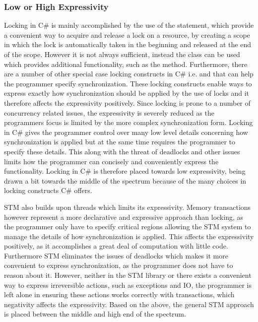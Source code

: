 \subsubsection{Low or High Expressivity}\label{subsec:expressivity}
Locking in C\# is mainly accomplished by the use of the  statement, which provide a convenient way to acquire and release a lock on a resource, by creating a scope in which the lock is automatically taken in the beginning and released at the end of the scope. However it is not always sufficient, instead the  class can be used which provides additional functionality, such as the  method. Furthermore, there are a number of other special case locking constructs in C\#\cite{microsoftSyncPrim} i.e.    and  that can help the programmer specify synchronization. These locking constructs enable ways to express exactly how synchronization should be applied by the use of locks and it therefore affects the expressivity positively. Since locking is prone to a number of concurrency related issues, the expressivity is severely reduced as the programmers focus is limited by the more complex synchronization form. Locking in C\# gives the programmer control over many low level details concerning how synchronization is applied but at the same time requires the programmer to specify these details. This along with the threat of deadlocks and other issues limits how the programmer can concisely and conveniently express the functionality. Locking in C\# is therefore placed towards low expressivity, being drawn a bit towards the middle of the spectrum because of the many choices in locking constructs C\# offers.

\ac{STM} also builds upon threads which limits its expressivity. Memory transactions however represent a more declarative and expressive approach than locking, as the programmer only have to specify critical regions allowing the \ac{STM} system to manage the details of how synchronization is applied. This affects the expressivity positively, as it accomplishes a great deal of computation with little code. Furthermore \ac{STM} eliminates the issues of deadlocks which makes it more convenient to express synchronization, as the programmer does not have to reason about it. However, neither in the \ac{STM} library or \stmname there exists a convenient way to express irreversible actions, such as exceptions and \ac{IO}, the programmer is left alone in ensuring these actions works correctly with transactions, which negativity affects the expressivity. Based on the above, the general \ac{STM} approach is placed between the middle and high end of the spectrum.

